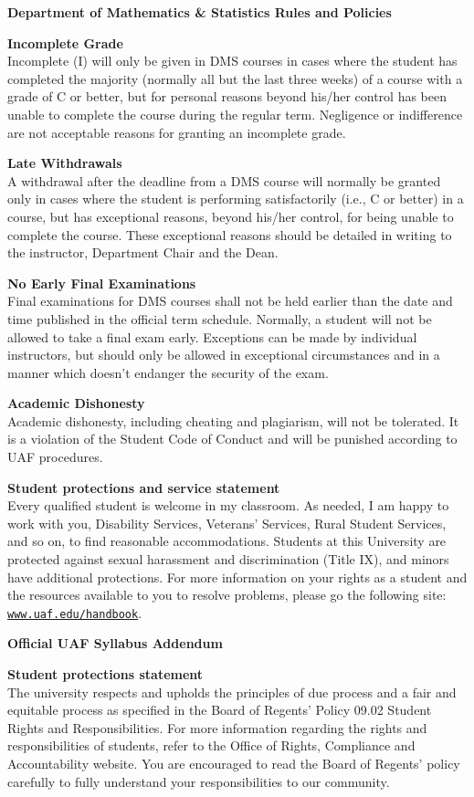 \documentclass[12pt]{article}
\renewcommand{\emph}[1]{\textsf{\textbf{#1}}}
\newcommand{\localhead}[1]{\par\smallskip\textbf{#1} \smallskip\nobreak\\}%
\def\heading#1{\localhead{\large\emph{#1}}}
\def\subheading#1{\localhead{\emph{#1}}}
\begin{document}
\phantom{foo}

\heading{Department of Mathematics \& Statistics Rules and Policies}
\vskip -20pt

\subheading{Incomplete Grade} 
Incomplete (I) will only be given in
  DMS courses in cases where
  the student has completed the majority (normally all but the last
  three weeks) of a course with a grade of C or better, but for
  personal reasons beyond his/her control has been unable to complete
  the course during the regular term. Negligence or indifference are
  not acceptable reasons for granting an incomplete grade.

\subheading{Late Withdrawals} 
A withdrawal after the deadline from a DMS course will
  normally be granted only in cases where the student is performing
  satisfactorily (i.e., C or better) in a course, but has exceptional
  reasons, beyond his/her control, for being unable to complete the
  course.  These exceptional reasons should be detailed in writing to
  the instructor, Department Chair and the Dean.

\subheading{No Early Final Examinations}
Final examinations for DMS courses shall not be held earlier than the date and time published in the official term schedule.  Normally, a student will not be allowed to take a final exam early.  Exceptions can be made by individual instructors, but should only be allowed in exceptional circumstances and in a manner which doesn't endanger the security of the exam.

\subheading{Academic Dishonesty}
Academic dishonesty, including cheating and plagiarism, will not be tolerated.  It is a violation of the Student Code of Conduct and will be punished according to UAF procedures.

\subheading{Student protections and service statement}
Every qualified student is welcome in my classroom.  As needed, I am happy to work with you, Disability Services, Veterans' Services, Rural Student Services, and so on, to find reasonable accommodations.  Students at this University are protected against sexual harassment and discrimination (Title IX), and minors have additional protections.  For more information on your rights as a student and the resources available to you to resolve problems, please go the following site: \href{https://www.uaf.edu/handbook/}{\texttt{www.uaf.edu/handbook}}.

\phantom{foo}
\heading{Official UAF Syllabus Addendum}

\subheading{Student protections statement} The university respects and upholds the principles of due process and a fair and equitable process as specified in the Board of Regents' Policy 09.02 Student Rights and Responsibilities. For more information regarding the rights and responsibilities of students, refer to the Office of Rights, Compliance and Accountability website. You are encouraged to read the Board of Regents' policy carefully to fully understand your responsibilities to our community.
\end{document}
